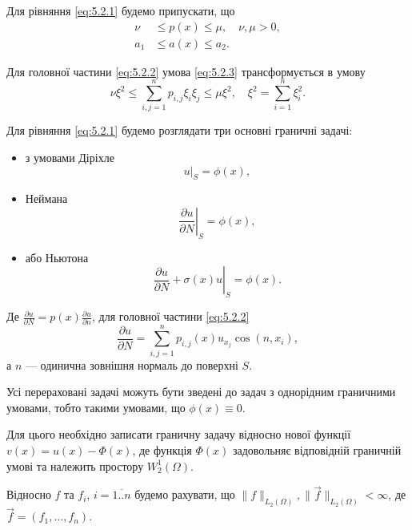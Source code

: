 Для рівняння \eqref{eq:5.2.1} будемо припускати, що 
\begin{align}
    \label{eq:5.2.3}
    \nu &\le p(x) \le \mu, \quad \nu, \mu > 0, \\
    \label{eq:5.2.3'}
    a_1 &\le a(x) \le a_2.
\end{align}

Для головної частини \eqref{eq:5.2.2} умова \eqref{eq:5.2.3} трансформується в умову
\begin{equation}
    \label{eq:5.2.3''}
    \nu \xi^2 \le \sum_{i,j=1}^n p_{i,j} \xi_i \xi_j \le \mu \xi^2, \quad \xi^2 = \sum_{i = 1}^n \xi_i^2.
\end{equation}

Для рівняння \eqref{eq:5.2.1} будемо розглядати три основні граничні задачі:
\begin{itemize}
    \item з умовами Діріхле
    \begin{equation}
        \label{eq:5.2.4}
        \left. u \right|_S = \phi(x), 
    \end{equation}
    \item Неймана
    \begin{equation}
        \label{eq:5.2.5}
        \left. \frac{\partial u}{\partial N} \right|_S = \phi(x), 
    \end{equation}
    \item або Ньютона
    \begin{equation}
        \label{eq:5.2.6}
        \left. \frac{\partial u}{\partial N} + \sigma(x) u \right|_S = \phi(x).
    \end{equation}
\end{itemize}

Де $\frac{\partial u}{\partial N} = p(x) \frac{\partial u}{\partial n}$, для головної частини \eqref{eq:5.2.2} \[\frac{\partial u}{\partial N} = \sum_{i,j=1}^n p_{i,j}(x) u_{x_j} \cos (n, x_i),\] а $n$ --- одинична зовнішня нормаль до поверхні $S$. \medskip

Усі перераховані задачі можуть бути зведені до задач з однорідним граничними умовами, тобто такими умовами, що $\phi(x) \equiv 0$. \medskip

Для цього необхідно записати граничну задачу відносно нової функції $v(x) = u(x) - \Phi(x)$, де функція $\Phi(x)$ задовольняє відповідній граничній умові та належить простору $W_2^1(\Omega)$. \medskip

Відносно $f$ та $f_i$, $i = \overline{1..n}$ будемо рахувати, що $\|f\|_{L_2(\Omega)}, \|\vec f\|_{L_2(\Omega)} < \infty$, де $\vec f = (f_1,\ldots,f_n)$. \medskip

